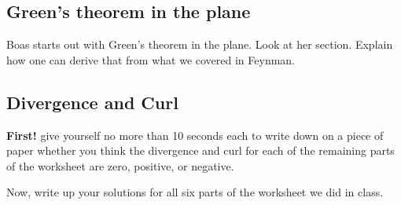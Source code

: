 \documentclass[12pt]{article}
\begin{document}
\subsection{Green's theorem in the plane}
Boas starts out with Green's theorem in the plane. Look at her
section. Explain how one can derive that from what we covered in
Feynman.

\subsection{Divergence and Curl}
\textbf{First!} give yourself no more than 10 seconds each to write
down on a piece of paper whether you think the divergence and curl for
each of the remaining parts of the worksheet are zero, positive, or
negative.

\noindent Now, write up your solutions for all six parts of the worksheet we did in class.
\end{document}
